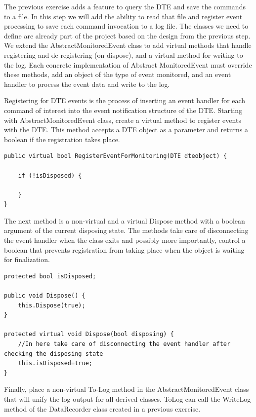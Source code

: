 \begin{Exercise}
The previous exercise adds a feature to query the DTE and save the commands to a file.  In this step we will add the ability to read that file and register event processing to save each command invocation to a log file.   The classes we need to define are already part of the project based on the design from the previous step.  We extend the AbstractMonitoredEvent class to add virtual methods that handle registering and de-registering (on dispose), and a virtual method for writing to the log.  Each concrete implementation of Abstract MonitoredEvent must override these methods, add an object of the type of event monitored, and an event handler to process the event data and write to the log.  

Registering for DTE events is the process of inserting an event handler for each command of interest into the event notification structure of the DTE.  Starting with AbstractMonitoredEvent class, create a virtual method to register events with the DTE.  This method accepts a DTE object as a parameter and returns a boolean if the registration takes place.

\begin{lstlisting}
public virtual bool RegisterEventForMonitoring(DTE dteobject) {

	if (!isDisposed) {
	
	}
}
\end{lstlisting}

The next method is a non-virtual and a virtual Dispose method with a boolean argument of the current disposing state.  The methods take care of disconnecting the event handler when the class exits and possibly more importantly, control a boolean that prevents registration from taking place when the object is waiting for finalization.

\begin{lstlisting}
protected bool isDisposed;

public void Dispose() {
	this.Dispose(true);
}

protected virtual void Dispose(bool disposing) {
	//In here take care of disconnecting the event handler after checking the disposing state
	this.isDisposed=true;
}
\end{lstlisting}

Finally, place a non-virtual To-Log method in the AbstractMonitoredEvent class that will unify the log output for all derived classes.  ToLog can call the WriteLog method of the DataRecorder class created in a previous exercise.


\end{Exercise}
